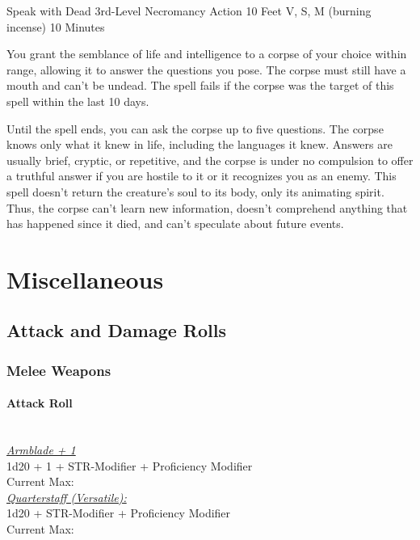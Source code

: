 \documentclass[letterpaper,openany,oneside,twocolumn]{book}
\begin{document}
\DndSpellHeader
  {Speak with Dead}
  {3rd-Level Necromancy}
  {Action}
  {10 Feet}
  {V, S, M (burning incense)}
  {10 Minutes}

You grant the semblance of life and intelligence to a corpse of your choice within range, allowing it to answer the questions you pose. The corpse must still have a mouth and can't be undead. The spell fails if the corpse was the target of this spell within the last 10 days.

Until the spell ends, you can ask the corpse up to five questions. The corpse knows only what it knew in life, including the languages it knew. Answers are usually brief, cryptic, or repetitive, and the corpse is under no compulsion to offer a truthful answer if you are hostile to it or it recognizes you as an enemy. This spell doesn't return the creature's soul to its body, only its animating spirit. Thus, the corpse can't learn new information, doesn't comprehend anything that has happened since it died, and can't speculate about future events.

\vfill\eject
\section*{Miscellaneous}
\subsection*{Attack and Damage Rolls}
\subsubsection*{Melee Weapons}
\paragraph*{Attack Roll}\hfill\\
\underline{\textit{Armblade + 1}}\\
1d20 + 1 + STR-Modifier + Proficiency Modifier\\
\indent Current Max: 
\\
\underline{\textit{Quarterstaff (Versatile):}}\\
1d20 + STR-Modifier + Proficiency Modifier\\
\indent Current Max: 
\end{document}
